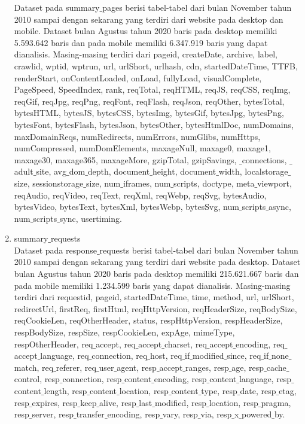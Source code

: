 \begin{enumerate}
	Dataset pada summary$\_$pages berisi tabel-tabel dari bulan November tahun 2010 sampai dengan sekarang yang terdiri dari website pada desktop dan mobile. Dataset bulan Agustus tahun 2020 baris pada desktop memiliki 5.593.642 baris dan pada mobile memiliki 6.347.919 baris yang dapat dianalisis. Masing-masing terdiri dari pageid, createDate, archive, label, crawlid, wptid, wptrun, url, urlShort, urlhash, cdn, startedDateTime, TTFB, renderStart, onContentLoaded, onLoad, fullyLoad, visualComplete, PageSpeed, SpeedIndex, rank, reqTotal, reqHTML, reqJS, reqCSS, reqImg, reqGif, reqJpg, reqPng, reqFont, reqFlash, reqJson, reqOther, bytesTotal, bytesHTML, bytesJS, bytesCSS, bytesImg, bytesGif, bytesJpg, bytesPng, bytesFont, bytesFlash, bytesJson, bytesOther, bytesHtmlDoc, numDomains, maxDomainReqs, numRedirects, numErrors, numGlibs, numHttps, numCompressed, numDomElements, maxageNull, maxage0, maxage1, maxage30, maxage365, maxageMore, gzipTotal, gzipSavings, $\_$connections, $\_$adult$\_$site, avg$\_$dom$\_$depth, document$\_$height, document$\_$width, localstorage$\_$size, sessionstorage$\_$size, num$\_$iframes, num$\_$scripts, doctype, meta$\_$viewport, reqAudio, reqVideo, reqText, reqXml, reqWebp, reqSvg, bytesAudio, bytesVideo, bytesText, bytesXml, bytesWebp, bytesSvg, num$\_$scripts$\_$async, num$\_$scripts$\_$sync, usertiming.
	\item summary$\_$requests\\
	Dataset pada response$\_$requests berisi tabel-tabel dari bulan November tahun 2010 sampai dengan sekarang yang terdiri dari website pada desktop. Dataset bulan Agustus tahun 2020 baris pada desktop memiliki 215.621.667 baris dan pada mobile memiliki 1.234.599 baris yang dapat dianalisis. Masing-masing terdiri dari requestid, pageid, startedDateTime, time, method, url, urlShort, redirectUrl, firstReq, firstHtml, reqHttpVersion, reqHeaderSize, reqBodySize, reqCookieLen, reqOtherHeader, status, respHttpVersion, respHeaderSize, respBodySize, respSize, respCookieLen, expAge, mimeType, respOtherHeader, req$\_$accept, req$\_$accept$\_$charset, req$\_$accept$\_$encoding, req$\_$accept$\_$language, req$\_$connection, req$\_$host, req$\_$if$\_$modified$\_$since, req$\_$if$\_$none$\_$match, req$\_$referer, req$\_$user$\_$agent, resp$\_$accept$\_$ranges, resp$\_$age, resp$\_$cache$\_$control, resp$\_$connection, resp$\_$content$\_$encoding, resp$\_$content$\_$language, resp$\_$content$\_$length, resp$\_$content$\_$location, resp$\_$content$\_$type, resp$\_$date, resp$\_$etag, resp$\_$expires, resp$\_$keep$\_$alive, resp$\_$last$\_$modified, resp$\_$location, resp$\_$pragma, resp$\_$server, resp$\_$transfer$\_$encoding, resp$\_$vary, resp$\_$via, resp$\_$x$\_$powered$\_$by.

\end{enumerate}

